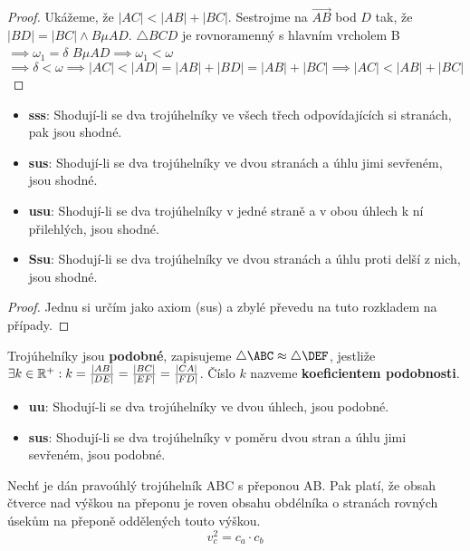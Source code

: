 \begin{proof}
  Ukážeme, že $|AC| < |AB| + |BC|$. Sestrojme na $\overrightarrow{AB}$ bod $D$ tak, že $|BD| = |BC| \land B \mu AD$. $\triangle BCD$ je rovnoramenný s hlavním vrcholem B $\implies \omega_1 = \delta$
  $B \mu AD \implies \omega_1 < \omega$
  $\implies \delta < \omega \implies |AC| < |AD| = |AB| + |BD| = |AB| + |BC| \implies |AC| < |AB| + |BC|$
\end{proof}

\begin{veta}
  \begin{itemize}
    \item \textbf{sss}: Shodují-li se dva trojúhelníky ve všech třech odpovídajících si stranách, pak jsou shodné.
    \item \textbf{sus}: Shodují-li se dva trojúhelníky ve dvou stranách a úhlu jimi sevřeném, jsou shodné.
    \item \textbf{usu}: Shodují-li se dva trojúhelníky v jedné straně a v obou úhlech k ní přilehlých, jsou shodné.
    \item \textbf{Ssu}: Shodují-li se dva trojúhelníky ve dvou stranách a úhlu proti delší z nich, jsou shodné.
  \end{itemize}
\end{veta}

\begin{proof}
  Jednu si určím jako axiom (sus) a zbylé převedu na tuto rozkladem na případy.
\end{proof}

\begin{definition}
  Trojúhelníky jsou \textbf{podobné}, zapisujeme $\triangle\ABC \approx \triangle\DEF$, jestliže $\exists k \in \mathbb{R}^+:k = \frac{|AB|}{|DE|}=\frac{|BC|}{|EF|}=\frac{|CA|}{|FD|}$. Číslo $k$ nazveme \textbf{koeficientem podobnosti}.
\end{definition}

\begin{veta}
  \begin{itemize}
    \item \textbf{uu}: Shodují-li se dva trojúhelníky ve dvou úhlech, jsou podobné.
    \item \textbf{sus}: Shodují-li se dva trojúhelníky v poměru dvou stran a úhlu jimi sevřeném, jsou podobné.
  \end{itemize}
\end{veta}

\begin{veta}
  Nechť je dán pravoúhlý trojúhelník ABC s přeponou AB. Pak platí, že obsah čtverce nad výškou na přeponu je roven obsahu obdélníka o stranách rovných úsekům na přeponě oddělených touto výškou.
  $$v_c^2 = c_a \cdot c_b$$
\end{veta}

